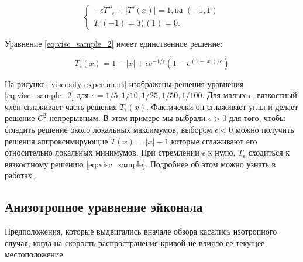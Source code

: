 \begin{equation}
  \label{eq:visc_sample_2}
  \left\{ \begin{matrix}
      -\epsilon T''_\epsilon+|T'(x)| = 1,\text{на } (-1,1) \\
      T_\epsilon(-1) = T_\epsilon(1) = 0.
    \end{matrix}\right.
\end{equation}

Уравнение \eqref{eq:visc_sample_2} имеет единственное решение:

\begin{equation*}
  T_\epsilon(x) = 1 - |x| + \epsilon e^{-1/\epsilon}(1 - e^{(1-|x|)/\epsilon})
\end{equation*}


На рисунке~\ref{viscosity-experiment} изображены решения уравнения
\eqref{eq:visc_sample_2} для  $\epsilon =
1/5,1/10,1/25,1/50,1/100$. Для малых $\epsilon$, вязкостный член
сглаживает часть решения $T_\epsilon(x)$. Фактически он сглаживает
углы и делает решение $C^2$ непрерывным. В этом примере мы выбрали
$\epsilon >0$ для того, чтобы сгладить решение около локальных максимумов, выбором
$\epsilon <0$ можно получить решения аппроксимирующие $T(x) = |x| -
1$,которые сглаживают его относительно локальных минимумов. При
стремлении $\epsilon$ к нулю, $T_\epsilon$ сходиться к вязкостному
решению \eqref{eq:visc_sample}. Подробнее об этом можно узнать в
работах \cite{V1984,V1983}.


\subsection{Анизотропное уравнение эйконала}

Предположения, которые выдвигались вначале обзора касались изотропного
случая, когда на скорость распространения кривой не влияло ее текущее местоположение.

